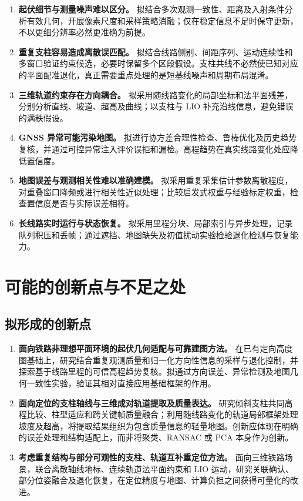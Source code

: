 \documentclass[UTF8,a4paper,12pt,fontset=fandol]{ctexart}
\begin{document}
\begin{enumerate}[label=\arabic*.]
 \item \textbf{起伏细节与测量噪声难以区分。}
 拟结合多次观测一致性、距离及入射条件分析有效几何，开展像素尺度和采样策略消融；仅在稳定信息不足时保守更新，不以更细分辨率必然更准确为前提。
 \item \textbf{重复支柱容易造成离散误匹配。}
 拟结合线路侧别、间距序列、运动连续性和多窗口验证约束候选，必要时保留多个区段假设。支柱共线不必然使已知对应的平面配准退化，真正需要重点处理的是短基线噪声和周期布局混淆。
 \item \textbf{三维轨道约束存在方向耦合。}
 拟采用随线路变化的局部坐标和法平面残差，分别分析直线、坡道、超高及曲线；以支柱与 LIO 补充沿线信息，避免错误的满秩假设。
 \item \textbf{GNSS 异常可能污染地图。}
 拟进行协方差合理性检查、鲁棒优化及历史趋势复核，并通过可控异常注入评价误拒和漏检。高程趋势在真实线路变化处应降低置信度。
 \item \textbf{地图误差与观测相关性难以准确建模。}
 拟采用重复采集估计参数离散程度，对重叠窗口降频或进行相关性近似处理；比较启发式权重与经验标定权重，检查置信度是否与实际误差相符。
 \item \textbf{长线路实时运行与状态恢复。}
 拟采用里程分块、局部索引与异步处理，记录队列积压和丢帧；通过遮挡、地图缺失及初值扰动实验检验退化检测与恢复能力。
\end{enumerate}

\section{可能的创新点与不足之处}

\subsection{拟形成的创新点}

\begin{enumerate}[label=\arabic*.]
 \item \textbf{面向铁路非理想平面环境的起伏几何适配与可靠建图方法。}
 在已有定向高度图基础上，研究结合重复观测质量和归一化方向性信息的采样与退化控制，并探索基于线路里程的可信高程趋势复核。拟通过方向误差、异常检测及地图几何一致性实验，验证其相对直接应用基础框架的作用。
 \item \textbf{面向定位的支柱轴线与三维成对轨道提取及质量表达。}
 研究倾斜支柱共同高程比较、柱型适应和跨关键帧质量融合；利用随线路变化的轨道局部框架处理坡度及超高，将提取结果组织为包含质量信息的轻量地图。创新应体现在明确的误差处理和结构适配上，而非将聚类、RANSAC 或 PCA 本身作为创新。
 \item \textbf{考虑重复结构与部分可观性的支柱、轨道互补重定位方法。}
 面向三维铁路场景，联合离散轴线地标、连续轨道法平面约束和 LIO 运动，研究关联确认、部分位姿融合及退化恢复，在定位精度与地图、计算负担之间获得可量化的改进。
\end{enumerate}
\end{document}
